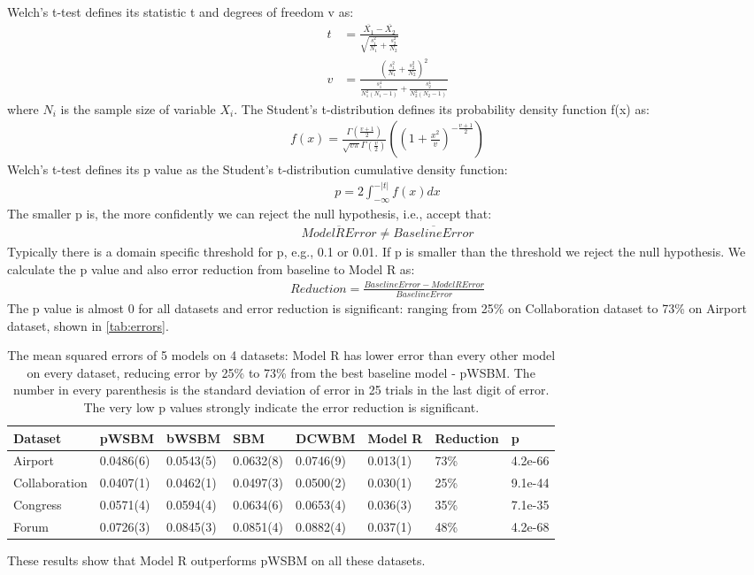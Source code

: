 \documentclass[conference]{IEEEtran}
\begin{document}
Welch's t-test defines its statistic t and degrees of freedom v as:
\begin{align*}
	t &= \frac{
		\overline{X_1} - \overline{X_2}
		}{
		\sqrt{\frac{s^2_1}{N_1} + \frac{s^2_2}{N_2}}
		}\\
	v &= \frac{
		(\frac{s^2_1}{N_1} + \frac{s^2_2}{N_2})^2
		}{
		\frac{s^4_1}{N_1^2(N_1-1)} + \frac{s^4_2}{N_2^2(N_2-1)}
		}
\end{align*}
where $ N_i $ is the sample size of variable $ X_i $.
The Student's t-distribution defines its probability density function f(x) as:
\begin{align*}
f(x) = \frac{\Gamma(\frac{v+1}{2})}{\sqrt{v\pi}\Gamma(\frac{v}{2})}
((1+\frac{x^2}{v})^{-\frac{v+1}{2}})
\end{align*}
Welch's t-test defines its p value as the Student's t-distribution cumulative density function:
\begin{align*}
p = 2 \int_{-\infty}^{-|t|} f(x) dx
\end{align*}
The smaller p is, the more confidently we can reject the null hypothesis, i.e., accept that:
\begin{align*}
\overline{ModelRError} \neq \overline{BaselineError}
\end{align*}
Typically there is a domain specific threshold for p, e.g., 0.1 or 0.01. If p is smaller than the threshold we reject the null hypothesis.
We calculate the p value and also error reduction from baseline to Model R as:
\begin{align*}
Reduction = \frac{BaselineError - ModelRError}{BaselineError}
\end{align*}
The p value is almost 0 for all datasets and error reduction is significant:
ranging from 25\% on Collaboration dataset to 73\% on Airport dataset,
shown in \autoref{tab:errors}.
\begin{table}[!htb]\centering
	\caption{
		The mean squared errors of 5 models on 4 datasets:
		Model R has lower error than every other model on every dataset,
		reducing error by 25\% to 73\% from the best baseline model - pWSBM.
		The number in every parenthesis is the standard deviation of error in 25 trials in the last digit of error. The very low p values strongly indicate the error reduction is significant.
	}
	\begin{tabularx}{\textwidth}{|X|X|X|X|X|X|X|X|} \hline \rowcolor{blue!40}
		Dataset & pWSBM & bWSBM & SBM & DCWBM & Model R & Reduction & p \\ \hline
		Airport & 0.0486(6) & 0.0543(5) & 0.0632(8) & 0.0746(9) & 0.013(1) & 73\% & 4.2e-66 \\ \hline
		Collaboration & 0.0407(1) & 0.0462(1) & 0.0497(3) & 0.0500(2) & 0.030(1) & 25\% & 9.1e-44 \\ \hline
		Congress & 0.0571(4) & 0.0594(4) & 0.0634(6) & 0.0653(4) & 0.036(3) & 35\% & 7.1e-35 \\ \hline
		Forum & 0.0726(3) & 0.0845(3) & 0.0851(4) & 0.0882(4) & 0.037(1) & 48\% & 4.2e-68 \\ \hline
	\end{tabularx}
	\label{tab:errors}
\end{table}
These results show that Model R outperforms pWSBM on all these datasets.
\end{document}
